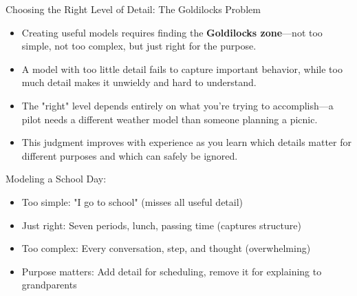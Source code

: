 \documentclass{beamer}
\begin{document}
	\begin{frame}{Choosing the Right Level of Detail: The Goldilocks Problem}
		\begin{itemize}
			\item Creating useful models requires finding the \textbf{Goldilocks zone}—not too simple, not too complex, but just right for the purpose.
			\item A model with too little detail fails to capture important behavior, while too much detail makes it unwieldy and hard to understand.
			\item The "right" level depends entirely on what you're trying to accomplish—a pilot needs a different weather model than someone planning a picnic.
			\item This judgment improves with experience as you learn which details matter for different purposes and which can safely be ignored.
		\end{itemize}
		
		\begin{example}
			\scriptsize
			Modeling a School Day:
			\begin{itemize}
				\item Too simple: "I go to school" (misses all useful detail)
				\item Just right: Seven periods, lunch, passing time (captures structure)
				\item Too complex: Every conversation, step, and thought (overwhelming)
				\item Purpose matters: Add detail for scheduling, remove it for explaining to grandparents
			\end{itemize}
		\end{example}
	\end{frame}
	
\end{document}
